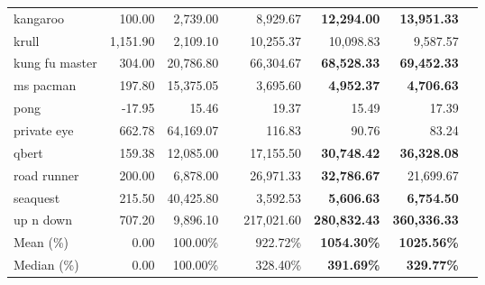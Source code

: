 \begin{table*}[h!t]
{\begin{tabular}{l|rr|rrrrr}
    kangaroo & 100.00 & 2,739.00 && 8,929.67 & \textbf{12,294.00} & \textbf{13,951.33} \\
    krull & 1,151.90 & 2,109.10 && 10,255.37 & 10,098.83 & 9,587.57 \\
    kung fu master & 304.00 & 20,786.80 && 66,304.67 & \textbf{68,528.33} & \textbf{69,452.33} \\
    ms pacman & 197.80 & 15,375.05 && 3,695.60 & \textbf{4,952.37} & \textbf{4,706.63} \\
    pong & -17.95 & 15.46 && 19.37 & 15.49 & 17.39 \\
    private eye & 662.78 & 64,169.07 && 116.83 & 90.76 & 83.24 \\
    qbert & 159.38 & 12,085.00 && 17,155.50 & \textbf{30,748.42} & \textbf{36,328.08} \\
    road runner & 200.00 & 6,878.00 && 26,971.33 & \textbf{32,786.67} & 21,699.67 \\
    seaquest & 215.50 & 40,425.80 && 3,592.53 & \textbf{5,606.63} & \textbf{6,754.50} \\
    up n down & 707.20 & 9,896.10 && 217,021.60 & \textbf{280,832.43} & \textbf{360,336.33} \\
    \midrule         
    Mean (\%) & 0.00 & 100.00\% && 922.72\% & \textbf{1054.30\%} & \textbf{1025.56\%} \\
    Median (\%) & 0.00 & 100.00\% && 328.40\% & \textbf{391.69\%} & \textbf{329.77\%} \\
    \bottomrule
    \end{tabular}
}
    \label{tab:Atari26-score}
\end{table*}
